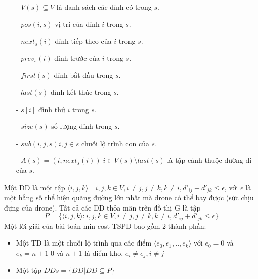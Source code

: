 \documentclass[a4paper,12pt]{report}
\begin{document}
\begin{itemize}
\item[-] $V(s) \subseteq V$ là danh sách các đỉnh có trong $s$.
\item[-] $pos(i,s)$ vị trí của đỉnh $i$ trong $s$.
\item[-] $next_s(i)$ đỉnh tiếp theo của $i$ trong $s$.
\item[-] $prev_s(i)$ đỉnh trước của $i$ trong $s$.
\item[-] $first(s)$ đỉnh bắt đầu trong $s$.
\item[-] $last(s)$ đỉnh kết thúc trong $s$.
\item[-] $s[i]$ đỉnh thứ $i$ trong $s$.
\item[-] $size(s)$ số lượng đỉnh trong $s$.
\item[-] $sub(i,j,s) i,j \in s $ chuỗi lộ trình con của $s$.
\item[-] $A(s)={(i,next_s(i))| i \in V(s)\setminus last(s)}$ là tập cảnh thuộc đường đi của $s$.

\end{itemize}

Một \ac{DD} là một tập $\langle i,j,k\rangle \quad i,j,k \in V, i \neq j, j \neq k,k \neq i, d'_{ij}+d'_{jk} \leq \epsilon $, với $\epsilon $ là một hằng số thể hiện quãng đường lớn nhất mà drone có thể bay được (sức chịu đựng của drone). Tất cả các \ac{DD} thỏa mãn trên đồ thị G là tập $$P=\{ \langle i,j,k \rangle : i,j,k \in V, i \neq j, j \neq k,k  \neq i, d'_{ij}+d'_{jk} \leq \epsilon  \}$$
Một lời giải của bài toán min-cost TSPD bao gồm 2 thành phần:
\begin{itemize}
\item Một \ac{TD} là một chuỗi lộ trình qua các điểm $\langle e_0,e_1,..,e_k \rangle $ với $e_0=0$ và $e_k=n+1$ $0$ và $n+1$ là điểm kho, $e_i \neq e_j , i \neq j$
\item Một tập $DDs=\{DD | DD \subseteq P \}$
\end{itemize} 
\end{document}
